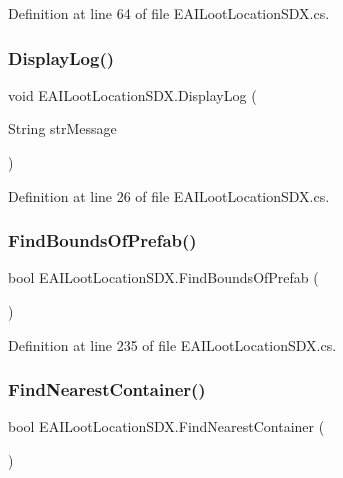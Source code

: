 Definition at line 64 of file E\+A\+I\+Loot\+Location\+S\+D\+X.\+cs.

\mbox{\label{class_e_a_i_loot_location_s_d_x_abdc9bb87714009f642ffd3bcc2ca02a5}} 
\subsubsection{\texorpdfstring{DisplayLog()}{DisplayLog()}}
{\footnotesize\ttfamily void E\+A\+I\+Loot\+Location\+S\+D\+X.\+Display\+Log (\begin{DoxyParamCaption}\item[{String}]{str\+Message }\end{DoxyParamCaption})}



Definition at line 26 of file E\+A\+I\+Loot\+Location\+S\+D\+X.\+cs.

\mbox{\label{class_e_a_i_loot_location_s_d_x_adda31f1fe3bccc84780f4c2ba5f00532}} 
\subsubsection{\texorpdfstring{FindBoundsOfPrefab()}{FindBoundsOfPrefab()}}
{\footnotesize\ttfamily bool E\+A\+I\+Loot\+Location\+S\+D\+X.\+Find\+Bounds\+Of\+Prefab (\begin{DoxyParamCaption}{ }\end{DoxyParamCaption})}



Definition at line 235 of file E\+A\+I\+Loot\+Location\+S\+D\+X.\+cs.

\mbox{\label{class_e_a_i_loot_location_s_d_x_ae5e22912ccbb99c0f38083b0dbe90bc4}} 
\subsubsection{\texorpdfstring{FindNearestContainer()}{FindNearestContainer()}}
{\footnotesize\ttfamily bool E\+A\+I\+Loot\+Location\+S\+D\+X.\+Find\+Nearest\+Container (\begin{DoxyParamCaption}{ }\end{DoxyParamCaption})}



